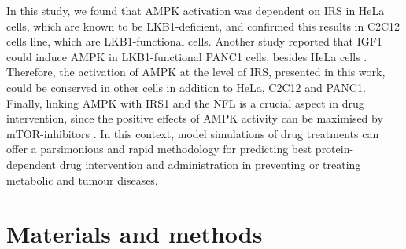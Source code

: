 In this study, we found that AMPK activation was dependent on IRS in HeLa cells, which are known to be LKB1-deficient, and confirmed this results in C2C12 cells line, which are LKB1-functional cells. Another study reported that IGF1 could induce AMPK in LKB1-functional PANC1 cells, besides HeLa cells \citep{Suzuki2004}. Therefore, the activation of AMPK at the level of IRS, presented in this work, could be conserved in other cells in addition to HeLa, C2C12 and PANC1.\\
Finally, linking AMPK with IRS1 and the NFL is a crucial aspect in drug intervention, since the positive effects of AMPK activity can be maximised by mTOR-inhibitors \citep{GarciaEcheverria2011}. In this context, model simulations of drug treatments can offer a parsimonious and rapid methodology for predicting best protein-dependent drug intervention and administration in preventing or treating metabolic and tumour diseases.


\section{Materials and methods}
\label{paper2-sec:Materials and methods}
